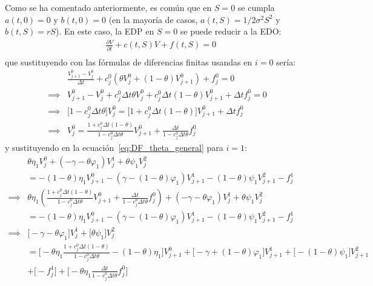 Como se ha comentado anteriormente, es común que en $S=0$ se cumpla $a(t,0)=0$ y $b(t,0)=0$ (en la mayoría de casos, $a(t,S)=1/2\sigma^2S^2$ y $b(t,S)=rS$). En este caso, la EDP en $S=0$ se puede reducir a la EDO:\@
\begin{align*}
    &\frac{\partial V}{\partial t} + c(t, S) V + f(t, S) = 0 \\
\end{align*}
que sustituyendo con las fórmulas de diferencias finitas usandas en $i=0$ sería:
\begin{align*}
    &\frac{V_{j+1}^0 - V_j^0}{\Delta t} + c_j^0 \left( \theta V_j^0 + (1-\theta) V_{j+1}^0 \right) + f_j^0 = 0 \\
    \implies &V_{j+1}^0 - V_j^0 + c_j^0 \Delta t \theta V_j^0 + c_j^0 \Delta t (1-\theta) V_{j+1}^0 + \Delta t f_j^0 = 0 \\
    \implies &\bigg[ 1 - c_j^0 \Delta t \theta \bigg] V_j^0 = \bigg[ 1 + c_j^0 \Delta t (1-\theta) \bigg] V_{j+1}^0 + \Delta t f_j^0 \\
    \implies &V_j^0 = \frac{1 + c_j^0 \Delta t (1-\theta)}{1 - c_j^0 \Delta t \theta} V_{j+1}^0 + \frac{\Delta t}{1 - c_j^0 \Delta t \theta} f_j^0
\end{align*}
y sustituyendo en la ecuación~\eqref{eq:DF_theta_general} para $i=1$:
\begin{align*}
    &\theta\eta_1 V_j^{0} +\left( -\gamma - \theta \varphi_1 \right)V_j^1 +\theta\psi_1 V_j^{2} \\
    &= - (1-\theta)\eta_1 V_{j+1}^{0} -\left( \gamma - (1-\theta) \varphi_1 \right)V_{j+1}^1 - (1-\theta)\psi_1 V_{j+1}^{2} - f_j^1 \\
    \implies &\theta\eta_1 \left( \frac{1 + c_j^0 \Delta t (1-\theta)}{1 - c_j^0 \Delta t \theta} V_{j+1}^0 + \frac{\Delta t}{1 - c_j^0 \Delta t \theta} f_j^0 \right) +\left( -\gamma - \theta \varphi_1 \right)V_j^1 +\theta\psi_1 V_j^{2} \\
    &= - (1-\theta)\eta_1 V_{j+1}^{0} -\left( \gamma - (1-\theta) \varphi_1 \right)V_{j+1}^1 - (1-\theta)\psi_1 V_{j+1}^{2} - f_j^1 \\
    \implies &\bigg[ -\gamma - \theta \varphi_1 \bigg]V_j^1 + \bigg[ \theta \psi_1 \bigg]V_j^{2} \\
    &= \bigg[ -\theta\eta_1 \frac{1 + c_j^0 \Delta t (1-\theta)}{1 - c_j^0 \Delta t \theta} - (1-\theta)\eta_1 \bigg] V_{j+1}^{0} + \bigg[ - \gamma + (1-\theta) \varphi_1 \bigg]V_{j+1}^1 + \bigg[ - (1-\theta)\psi_1 \bigg]V_{j+1}^{2} \\
    &+ \bigg[- f_j^1 \bigg] + \bigg[ -\theta\eta_1 \frac{\Delta t}{1 - c_j^0 \Delta t \theta}f_j^0 \bigg]
\end{align*}
